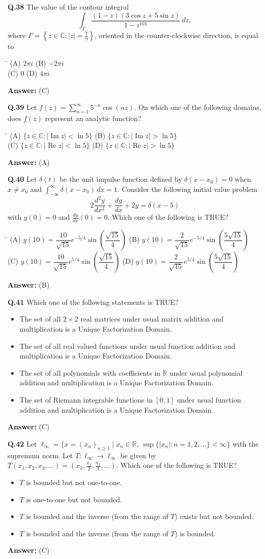\documentclass[11pt,a4paper]{article}
\newcommand{\optsfourA}[4]{%
  \begin{tabbing}
    \hspace{0.48\linewidth}\=\kill
    (A) #1 \> (B) #2 \\[2pt]
    (C) #3 \> (D) #4
  \end{tabbing}%
}
\newcommand{\optslistA}[4]{%
  \begin{itemize}
    \setlength{\itemsep}{2pt}\setlength{\parskip}{0pt}
    \item[(A)] #1
    \item[(B)] #2
    \item[(C)] #3
    \item[(D)] #4
  \end{itemize}%
}
\newcommand{\ans}[1]{\textbf{Answer:} #1\par\medskip}
\begin{document}
\textbf{Q.38} The value of the contour integral
\[
  \int_\Gamma \frac{(1 - z)(3\cos z + 5\sin z)}{1 - z^{101}}\,dz,
\]
where $\Gamma = \left\{z \in \mathbb{C} : |z| = \frac{7}{9}\right\}$, oriented in the counter-clockwise direction, is equal to
\optsfourA{$2\pi i$}{$-2\pi i$}{$0$}{$4\pi i$}
\ans{(C)}

\textbf{Q.39} Let $f(z) = \sum_{n=1}^{\infty} 5^{-n} \cos(nz)$. On which one of the following domains, does $f(z)$ represent an analytic function?
\optsfourA{$\{z \in \mathbb{C} : |\operatorname{Im} z| < \ln 5\}$}{$\{z \in \mathbb{C} : |\operatorname{Im} z| > \ln 5\}$}{$\{z \in \mathbb{C} : |\operatorname{Re} z| < \ln 5\}$}{$\{z \in \mathbb{C} : |\operatorname{Re} z| > \ln 5\}$}
\ans{(A)}

\textbf{Q.40} Let $\delta(t)$ be the unit impulse function defined by $\delta(x - x_0) = 0$ when $x \ne x_0$ and $\int_{-\infty}^{\infty} \delta(x - x_0)\,dx = 1$. Consider the following initial value problem
\[
  2\frac{d^2 y}{dx^2} + \frac{dy}{dx} + 2y = \delta(x - 5)
\]
with $y(0) = 0$ and $\frac{dy}{dx}(0) = 0$. Which one of the following is TRUE?
\optsfourA{$y(10) = \dfrac{10}{\sqrt{15}} e^{-5/4} \sin\!\left(\dfrac{\sqrt{15}}{4}\right)$}{$y(10) = \dfrac{2}{\sqrt{15}} e^{-5/4} \sin\!\left(\dfrac{5\sqrt{15}}{4}\right)$}{$y(10) = \dfrac{10}{\sqrt{15}} e^{5/4} \sin\!\left(\dfrac{\sqrt{15}}{4}\right)$}{$y(10) = \dfrac{2}{\sqrt{15}} e^{5/4} \sin\!\left(\dfrac{5\sqrt{15}}{4}\right)$}
\ans{(B)}

\textbf{Q.41} Which one of the following statements is TRUE?
\optslistA{The set of all $2 \times 2$ real matrices under usual matrix addition and multiplication is a Unique Factorization Domain.}{The set of all real valued functions under usual function addition and multiplication is a Unique Factorization Domain.}{The set of all polynomials with coefficients in $\mathbb{R}$ under usual polynomial addition and multiplication is a Unique Factorization Domain.}{The set of Riemann integrable functions in $[0, 1]$ under usual function addition and multiplication is a Unique Factorization Domain.}
\ans{(C)}

\textbf{Q.42} Let $\ell_\infty = \{x = (x_n)_{n \ge 1} \mid x_n \in \mathbb{R}, \, \sup\{|x_n| : n = 1, 2, \ldots\} < \infty\}$ with the supremum norm. Let $T : \ell_\infty \to \ell_\infty$ be given by $T(x_1, x_2, x_3, \ldots) = \left(x_1, \frac{x_2}{2}, \frac{x_3}{3}, \ldots\right)$. Which one of the following is TRUE?
\optslistA{$T$ is bounded but not one-to-one.}{$T$ is one-to-one but not bounded.}{$T$ is bounded and the inverse (from the range of $T$) exists but not bounded.}{$T$ is bounded and the inverse (from the range of $T$) is bounded.}
\ans{(C)}
\end{document}
